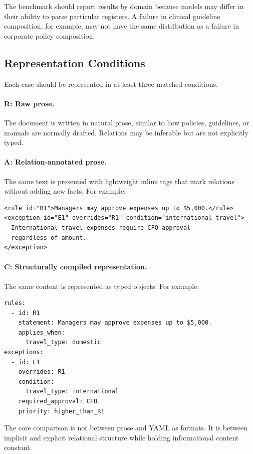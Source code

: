 \documentclass[11pt]{article}
\begin{document}
The benchmark should report results by domain because models may differ in their ability to parse particular registers. A failure in clinical guideline composition, for example, may not have the same distribution as a failure in corporate policy composition.

\subsection{Representation Conditions}

Each case should be represented in at least three matched conditions.

\paragraph{R: Raw prose.} The document is written in natural prose, similar to how policies, guidelines, or manuals are normally drafted. Relations may be inferable but are not explicitly typed.

\paragraph{A: Relation-annotated prose.} The same text is presented with lightweight inline tags that mark relations without adding new facts. For example:

\begin{verbatim}
<rule id="R1">Managers may approve expenses up to $5,000.</rule>
<exception id="E1" overrides="R1" condition="international travel">
  International travel expenses require CFO approval
  regardless of amount.
</exception>
\end{verbatim}

\paragraph{C: Structurally compiled representation.} The same content is represented as typed objects. For example:

\begin{verbatim}
rules:
  - id: R1
    statement: Managers may approve expenses up to $5,000.
    applies_when:
      travel_type: domestic
exceptions:
  - id: E1
    overrides: R1
    condition:
      travel_type: international
    required_approval: CFO
    priority: higher_than_R1
\end{verbatim}

The core comparison is not between prose and YAML as formats. It is between implicit and explicit relational structure while holding informational content constant.
\end{document}
